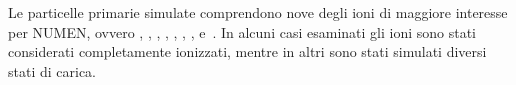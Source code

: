 Le particelle primarie simulate comprendono nove degli ioni di maggiore interesse per NUMEN, ovvero , , , , , , ,  e~.
In alcuni casi esaminati gli ioni sono stati considerati completamente ionizzati, mentre in altri sono stati simulati diversi stati di carica.







